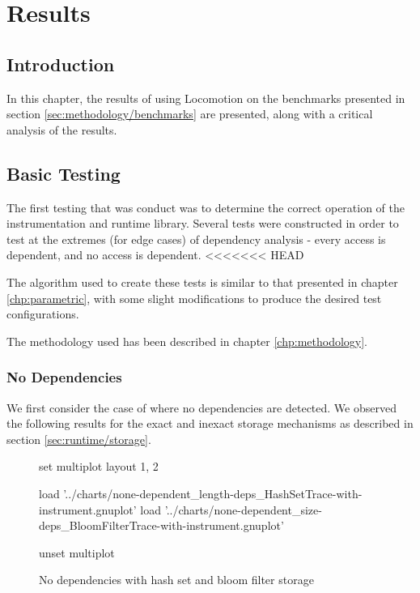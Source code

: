 \chapter{Results} \label{chp:results}
\section{Introduction} \label{sec:results/introduction}
In this chapter, the results of using Locomotion on the benchmarks presented in section \ref{sec:methodology/benchmarks} are presented, along with a critical analysis of the results.

\section{Basic Testing} \label{sec:results/basic}
The first testing that was conduct was to determine the correct operation of the instrumentation and runtime library. Several tests were constructed in order to test at the extremes (for edge cases) of dependency analysis - every access is dependent, and no access is dependent.
<<<<<<< HEAD

The algorithm used to create these tests is similar to that presented in chapter \ref{chp:parametric}, with some slight modifications to produce the desired test configurations.

The methodology used has been described in chapter \ref{chp:methodology}.

	\subsection{No Dependencies} \label{sec:result/basic/no-dep}
	We first consider the case of where no dependencies are detected. We observed the following results for the exact and inexact storage mechanisms as described in section \ref{sec:runtime/storage}.
	
	\begin{figure}[H]
		\centering
		\begin{gnuplot}[terminal=pdf]
		set multiplot layout 1, 2
		
		load '../charts/none-dependent_length-deps_HashSetTrace-with-instrument.gnuplot'
		load '../charts/none-dependent_size-deps_BloomFilterTrace-with-instrument.gnuplot'
		
		unset multiplot
		\end{gnuplot}
		\label{chart:none-dependent-deps-comparison}
		\caption{No dependencies with hash set and bloom filter storage}
	\end{figure}
	
